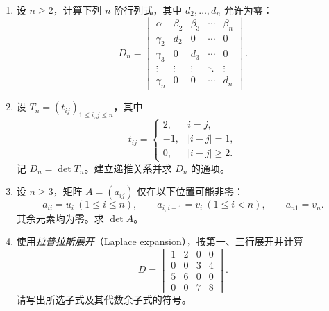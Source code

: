 \documentclass[UTF8,12pt,a4paper,fontset=fandol]{ctexart}
\begin{document}
\begin{enumerate}[label=\arabic*.,resume=detquestions]
\item\label{q:arrow}
设 $n\geq2$，计算下列 $n$ 阶行列式，其中 $d_2,\ldots,d_n$ 允许为零：
\[
D_n=\begin{vmatrix}
\alpha&\beta_2&\beta_3&\cdots&\beta_n\\
\gamma_2&d_2&0&\cdots&0\\
\gamma_3&0&d_3&\cdots&0\\
\vdots&\vdots&\vdots&\ddots&\vdots\\
\gamma_n&0&0&\cdots&d_n
\end{vmatrix}.
\]

\item\label{q:tridiagonal}
设 $T_n=(t_{ij})_{1\leq i,j\leq n}$，其中
\[
t_{ij}=\begin{cases}2,&i=j,\\-1,&|i-j|=1,\\0,&|i-j|\geq2.\end{cases}
\]
记 $D_n=\det T_n$。建立递推关系并求 $D_n$ 的通项。

\item\label{q:cyclic}
设 $n\geq3$，矩阵 $A=(a_{ij})$ 仅在以下位置可能非零：
\[
a_{ii}=u_i\ (1\leq i\leq n),\qquad
a_{i,i+1}=v_i\ (1\leq i<n),\qquad a_{n1}=v_n.
\]
其余元素均为零。求 $\det A$。

\item\label{q:laplace}
使用\emph{拉普拉斯展开}（Laplace expansion），按第一、三行展开并计算
\[
D=\begin{vmatrix}
1&2&0&0\\0&0&3&4\\5&6&0&0\\0&0&7&8
\end{vmatrix}.
\]
请写出所选子式及其代数余子式的符号。
\end{enumerate}
\end{document}
